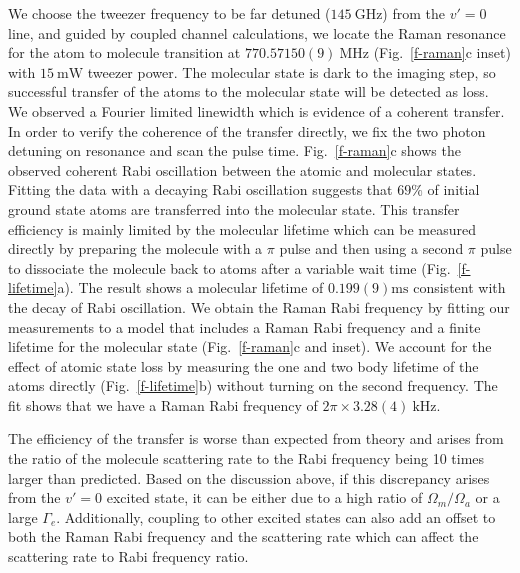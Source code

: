 \documentclass[aps,prl,twocolumn,superscriptaddress]{revtex4-1}
\begin{document}
We choose the tweezer frequency to be far detuned ($145 ~\mathrm{GHz}$) from the $v' = 0$ line, and guided by coupled channel calculations,
we locate the Raman resonance for the atom to molecule transition at
$770.57150(9) ~\mathrm{MHz}$ (Fig.~\ref{f-raman}c inset)
with $15 ~\mathrm{mW}$ tweezer power.
The molecular state is dark to the imaging step,
so successful transfer of the atoms to the molecular state will be detected as loss.
We observed a Fourier limited linewidth which is evidence of a coherent transfer.
In order to verify the coherence of the transfer directly,
we fix the two photon detuning on resonance and scan the pulse time.
Fig.~\ref{f-raman}c shows the observed coherent Rabi oscillation between the atomic and molecular states.
Fitting the data with a decaying Rabi oscillation suggests that
$69\%$ of initial ground state atoms are transferred into the molecular state.
This transfer efficiency is mainly limited by the molecular lifetime
which can be measured directly by preparing the molecule with a $\pi $ pulse
and then using a second $\pi$ pulse to dissociate the molecule back to atoms
after a variable wait time (Fig.~\ref{f-lifetime}a).
The result shows a molecular lifetime of $0.199(9) \mathrm{ms}$
consistent with the decay of Rabi oscillation.
We obtain the Raman Rabi frequency by fitting our measurements to a model
that includes a Raman Rabi frequency and
a finite lifetime for the molecular state (Fig.~\ref{f-raman}c and inset).
We account for the effect of atomic state loss by measuring the one and
two body lifetime of the atoms directly (Fig.~\ref{f-lifetime}b)
without turning on the second frequency.
The fit shows that we have a Raman Rabi frequency of $2\pi\times3.28(4) ~\mathrm{kHz}$.

The efficiency of the transfer is worse than expected from theory and arises from the ratio of the molecule scattering rate to the Rabi frequency being 10 times larger than predicted.
Based on the discussion above, if this discrepancy arises from the $v'=0$ excited state,
it can be either due to a high ratio of $\Omega_m / \Omega_a$ or a large $\Gamma_e$.
Additionally, coupling to other excited states can also add an offset to
both the Raman Rabi frequency and the scattering rate
which can affect the scattering rate to Rabi frequency ratio.
\end{document}
